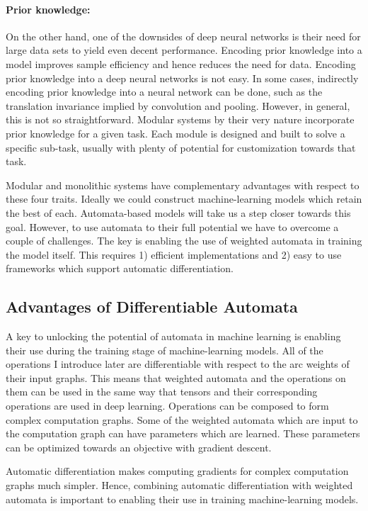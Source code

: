 \paragraph{Prior knowledge:} On the other hand, one of the downsides of deep
neural networks is their need for large data sets to yield even decent
performance. Encoding prior knowledge into a model improves sample efficiency
and hence reduces the need for data. Encoding prior knowledge into a deep
neural networks is not easy. In some cases, indirectly encoding prior knowledge into a
neural network can be done, such as the translation invariance implied by
convolution and pooling. However, in general, this is not so straightforward.
Modular systems by their very nature incorporate prior knowledge for a given
task. Each module is designed and built to solve a specific sub-task, usually
with plenty of potential for customization towards that task.

Modular and monolithic systems have complementary advantages with respect to
these four traits. Ideally we could construct machine-learning models which
retain the best of each. Automata-based models will take us a step closer
towards this goal. However, to use automata to their full potential we have to
overcome a couple of challenges. The key is enabling the use of weighted
automata in training the model itself. This requires 1) efficient
implementations and 2) easy to use frameworks which support automatic
differentiation.

\subsection{Advantages of Differentiable Automata}
\label{sec:advantages}

A key to unlocking the potential of automata in machine learning is enabling
their use during the training stage of machine-learning models. All of the
operations I introduce later are differentiable with respect to the arc weights
of their input graphs. This means that weighted automata and the operations on
them can be used in the same way that tensors and their corresponding
operations are used in deep learning. Operations can be composed to form complex
computation graphs. Some of the weighted automata which are input to the
computation graph can have parameters which are learned. These parameters can
be optimized towards an objective with gradient descent.

Automatic differentiation makes computing gradients for complex computation
graphs much simpler. Hence, combining automatic differentiation with weighted
automata is important to enabling their use in training machine-learning
models.

